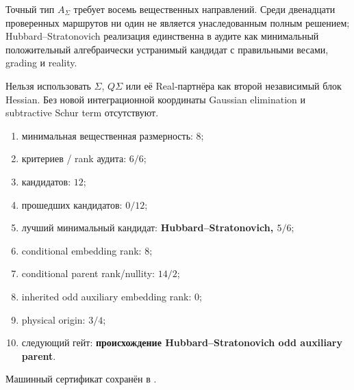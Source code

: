 \begin{theorem}
Точный тип $A_\Sigma$ требует восемь вещественных направлений. Среди
двенадцати проверенных маршрутов ни один не является унаследованным полным
решением; Hubbard--Stratonovich реализация единственна в аудите как
минимальный положительный алгебраически устранимый кандидат с правильными
весами, grading и reality.
\end{theorem}

\begin{nogocriterion}
Нельзя использовать $\Sigma$, $Q\Sigma$ или её Real-партнёра как второй
независимый блок Hessian. Без новой интеграционной координаты Gaussian
elimination и subtractive Schur term отсутствуют.
\end{nogocriterion}

\begin{protocol}\begin{enumerate}
\item минимальная вещественная размерность: \textbf{$8$};
\item критериев / rank аудита: \textbf{$6/6$};
\item кандидатов: \textbf{$12$};
\item прошедших кандидатов: \textbf{$0/12$};
\item лучший минимальный кандидат: \textbf{Hubbard--Stratonovich, $5/6$};
\item conditional embedding rank: \textbf{$8$};
\item conditional parent rank/nullity: \textbf{$14/2$};
\item inherited odd auxiliary embedding rank: \textbf{$0$};
\item physical origin: \textbf{$3/4$};
\item следующий гейт: \textbf{происхождение Hubbard--Stratonovich odd auxiliary parent}.
\end{enumerate}\end{protocol}

Машинный сертификат сохранён в
.